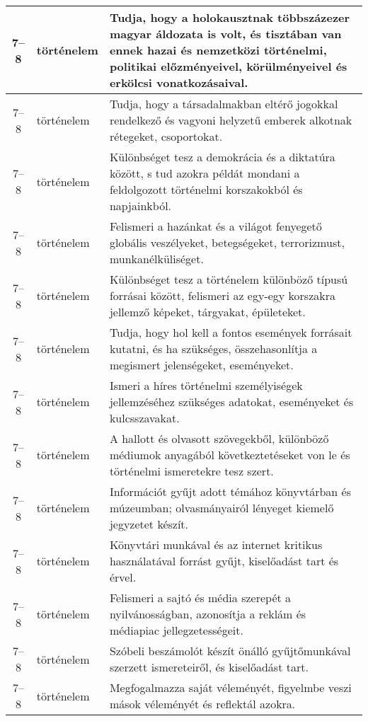 \begin{small}
\begin{longtable}{c | p{2cm} |  p{11cm} }
              7--8 & történelem & Tudja, hogy a holokausztnak többszázezer magyar áldozata is volt, és  tisztában van ennek hazai és nemzetközi történelmi, politikai előzményeivel, körülményeivel és erkölcsi vonatkozásaival. \\ \hline
              7--8 & történelem & Tudja, hogy a társadalmakban eltérő jogokkal rendelkező és vagyoni helyzetű emberek alkotnak rétegeket, csoportokat. \\ \hline
              7--8 & történelem & Különbséget tesz a demokrácia és a diktatúra között, s tud azokra példát mondani a feldolgozott történelmi korszakokból és napjainkból. \\ \hline
              7--8 & történelem & Felismeri a hazánkat és a világot fenyegető globális veszélyeket, betegségeket, terrorizmust, munkanélküliséget. \\ \hline
              7--8 & történelem & Különbséget tesz a történelem különböző típusú forrásai között, felismeri az egy-egy korszakra jellemző képeket, tárgyakat, épületeket. \\ \hline
              7--8 & történelem & Tudja, hogy hol kell a fontos események forrásait kutatni, és ha szükséges, összehasonlítja a megismert jelenségeket, eseményeket. \\ \hline
              7--8 & történelem & Ismeri a híres történelmi személyiségek jellemzéséhez szükséges adatokat, eseményeket és kulcsszavakat. \\ \hline
              7--8 & történelem & A hallott és olvasott szövegekből, különböző médiumok anyagából következtetéseket von le és történelmi ismeretekre tesz szert. \\ \hline
              7--8 & történelem & Információt gyűjt adott témához könyvtárban és múzeumban; olvasmányairól lényeget kiemelő jegyzetet készít. \\ \hline
              7--8 & történelem & Könyvtári munkával és az internet kritikus használatával forrást gyűjt, kiselőadást tart és érvel. \\ \hline
              7--8 & történelem & Felismeri a sajtó és média szerepét a nyilvánosságban, azonosítja a reklám és médiapiac jellegzetességeit. \\ \hline
              7--8 & történelem & Szóbeli beszámolót készít önálló gyűjtőmunkával szerzett ismereteiről, és kiselőadást tart. \\ \hline
              7--8 & történelem & Megfogalmazza saját véleményét, figyelmbe veszi mások véleményét és reflektál azokra. \\ \hline

\end{longtable}
\end{small}
